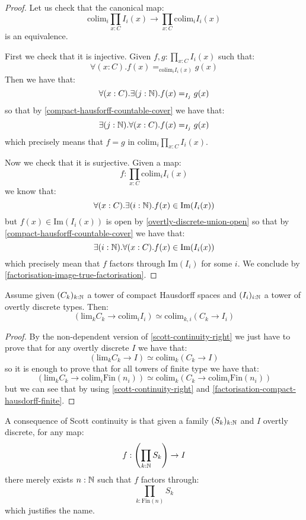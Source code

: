 \begin{proof}
Let us check that the canonical map:
\[\mathrm{colim}_i \prod_{x:C} I_i(x) \to \prod_{x:C} \mathrm{colim}_i I_i(x) \]
is an equivalence. 

First we check that it is injective. Given $f,g:\prod_{x:C} I_i(x)$ such that:
\[\forall(x:C).  f(x) =_{\mathrm{colim}_iI_i(x)} g(x)\]
Then we have that:
\[\forall(x:C).  \exists(j:\mathbb{N}). f(x) =_{I_j} g(x)\]
so that by \cref{compact-hausforff-countable-cover} we have that:
\[\exists(j:\mathbb{N}). \forall(x:C). f(x) =_{I_j} g(x)\]
which precisely means that $f=g$ in $\mathrm{colim}_i \prod_{x:C} I_i(x)$.

Now we check that it is surjective. Given a map:
\[f: \prod_{x:C} \mathrm{colim}_i I_i(x)\]
we know that:
\[\forall(x:C). \exists(i:\mathbb{N}). f(x)\in \mathrm{Im}(I_i(x))\]
but $f(x)\in \mathrm{Im}(I_i(x))$ is open by \cref{overtly-discrete-union-open} so that by \cref{compact-hausforff-countable-cover} we have that:
\[\exists(i:\mathbb{N}). \forall(x:C).  f(x)\in \mathrm{Im}(I_i(x))\]
which precisely mean that $f$ factors through $\mathrm{Im}(I_i)$ for some $i$. We conclude by \cref{factorisation-image-true-factorisation}.
\end{proof}

\begin{theorem}\label{scott-continuity}
Assume given $(C_k)_{k:\mathbb{N}}$ a tower of compact Hausdorff spaces and $(I_i)_{i:\mathbb{N}}$ a tower of overtly discrete types. Then:
\[\left( \mathrm{lim}_k C_k \to \mathrm{colim}_i I_i\right) \simeq \mathrm{colim}_{k,i} (C_k\to I_i)\]
\end{theorem}

\begin{proof}
By the non-dependent version of \cref{scott-continuity-right} we just have to prove that for any overtly discrete $I$ we have that:
\[(\mathrm{lim}_kC_k\to I) \simeq \mathrm{colim}_k(C_k\to I)\]
so it is enough to prove that for all towers of finite type we have that:
\[(\mathrm{lim}_kC_k\to \mathrm{colim}_i\mathrm{Fin}(n_i)) \simeq \mathrm{colim}_k(C_k\to \mathrm{colim}_i\mathrm{Fin}(n_i))\]
but we can see that by using \cref{scott-continuity-right} and \cref{factorisation-compact-hausdorff-finite}.
\end{proof}

\begin{remark}
A consequence of Scott continuity is that given a family $(S_k)_{k:\mathbb{N}}$ and $I$ overtly discrete, for any map:
\[f: \left(\prod_{k:\mathbb{N}} S_k\right) \to I\]
there merely exists $n:\mathbb{N}$ such that $f$ factors through:
\[\prod_{k:\mathrm{Fin}(n)} S_k\]
which justifies the name.
\end{remark}



